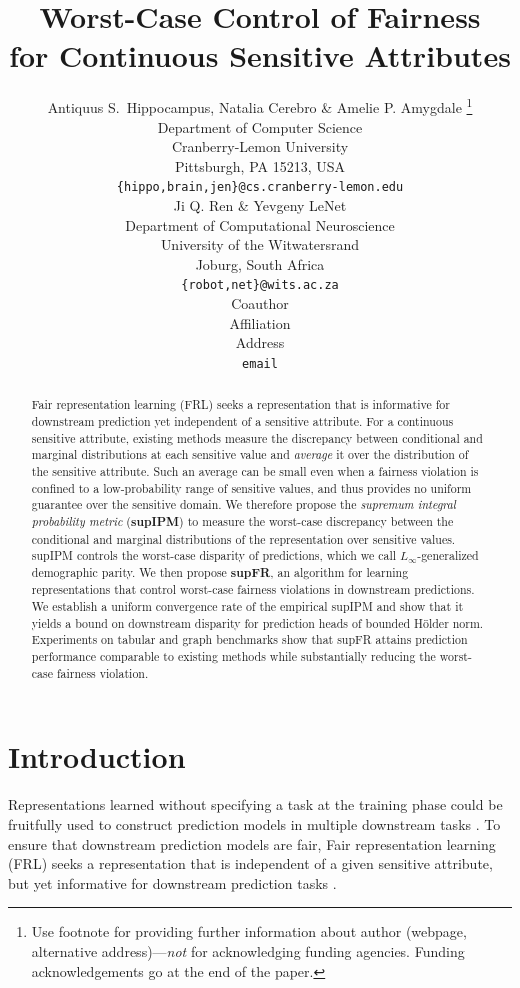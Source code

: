 \documentclass{article} %
\title{Worst-Case Control of Fairness \\for Continuous Sensitive Attributes}
\author{Antiquus S.~Hippocampus, Natalia Cerebro \& Amelie P. Amygdale \thanks{ Use footnote for providing further information
about author (webpage, alternative address)---\emph{not} for acknowledging
funding agencies.  Funding acknowledgements go at the end of the paper.} \\
Department of Computer Science\\
Cranberry-Lemon University\\
Pittsburgh, PA 15213, USA \\
\texttt{\{hippo,brain,jen\}@cs.cranberry-lemon.edu} \\
\And
Ji Q. Ren \& Yevgeny LeNet \\
Department of Computational Neuroscience \\
University of the Witwatersrand \\
Joburg, South Africa \\
\texttt{\{robot,net\}@wits.ac.za} \\
\AND
Coauthor \\
Affiliation \\
Address \\
\texttt{email}
}
\begin{document}
\maketitle
\begin{abstract}
Fair representation learning (FRL) seeks a representation that is informative for downstream prediction yet independent of a sensitive attribute. For a continuous sensitive attribute, existing methods measure the discrepancy between conditional and marginal distributions at each sensitive value and \emph{average} it over the distribution of the sensitive attribute. Such an average can be small even when a fairness violation is confined to a low-probability range of sensitive values, and thus provides no uniform guarantee over the sensitive domain. 
We therefore propose the \emph{supremum integral probability metric} (\textbf{supIPM}) to measure the worst-case discrepancy between the conditional and marginal distributions of the representation over sensitive values.
supIPM controls the worst-case disparity of predictions, which we call $L_\infty$-generalized demographic parity.
We then propose \textbf{supFR}, an algorithm for learning representations that control worst-case fairness violations in downstream predictions.
We establish a uniform convergence rate of the empirical supIPM and show that it yields a bound on downstream disparity for prediction heads of bounded Hölder norm.
Experiments on tabular and graph benchmarks show that supFR attains prediction performance comparable to existing methods while substantially reducing the worst-case fairness violation.
\end{abstract}

\section{Introduction}

Representations learned without specifying a task at the training phase
could be fruitfully used to construct prediction models in multiple downstream tasks \citep{bengio2013representation}.  
To ensure that downstream prediction models are fair, 
Fair representation learning (FRL) seeks a representation that is independent of a given sensitive attribute, but yet informative for downstream prediction tasks 
\citep{zemel2013learning,moyer2018invariant,creager2019flexibly,song2019learning,balunovic2021fair,gitiaux2021learning,jovanovic2023fare}.
\end{document}
